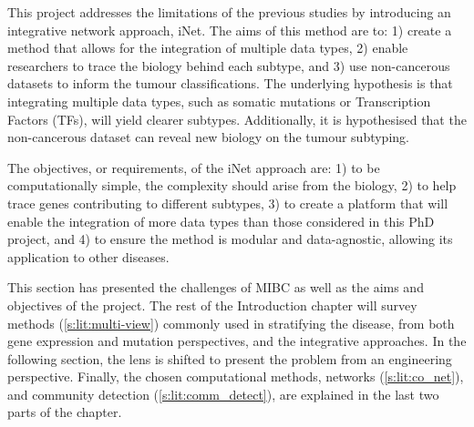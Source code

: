 This project addresses the limitations of the previous studies by introducing an integrative network approach, iNet. The aims of this method are to: 1) create a method that allows for the integration of multiple data types, 2) enable researchers to trace the biology behind each subtype, and 3) use non-cancerous datasets to inform the tumour classifications. The underlying hypothesis is that integrating multiple data types, such as somatic mutations or Transcription Factors (TFs), will yield clearer subtypes. Additionally, it is hypothesised that the non-cancerous dataset can reveal new biology on the tumour subtyping.

The objectives, or requirements, of the iNet approach are: 1) to be computationally simple, the complexity should arise from the biology, 2) to help trace genes contributing to different subtypes, 3) to create a platform that will enable the integration of more data types than those considered in this PhD project, and 4) to ensure the method is modular and data-agnostic, allowing its application to other diseases.

This section has presented the challenges of MIBC as well as the aims and objectives of the project. The rest of the Introduction chapter will survey methods (\ref{s:lit:multi-view}) commonly used in stratifying the disease, from both gene expression and mutation perspectives, and the integrative approaches. In the following section, the lens is shifted to present the problem from an engineering perspective. Finally, the chosen computational methods, networks (\ref{s:lit:co_net}), and community detection (\ref{s:lit:comm_detect}), are explained in the last two parts of the chapter.
